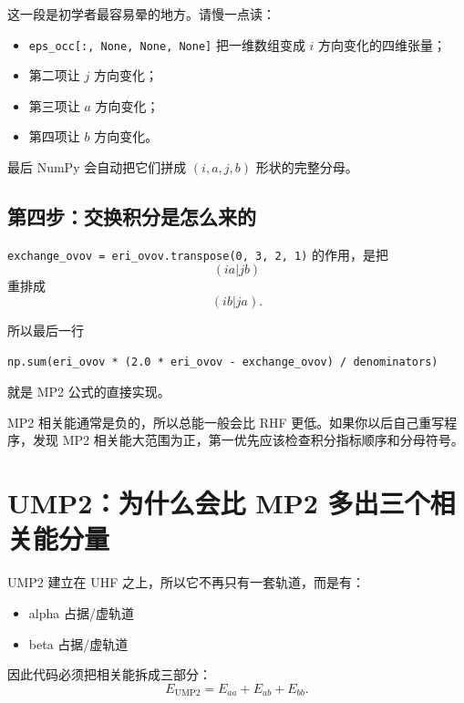 \documentclass[UTF8,11pt,fontset=fandol]{ctexbook}
\begin{document}
这一段是初学者最容易晕的地方。请慢一点读：
\begin{itemize}
  \item \texttt{eps\_occ[:, None, None, None]} 把一维数组变成 \(i\) 方向变化的四维张量；
  \item 第二项让 \(j\) 方向变化；
  \item 第三项让 \(a\) 方向变化；
  \item 第四项让 \(b\) 方向变化。
\end{itemize}

最后 NumPy 会自动把它们拼成 \((i,a,j,b)\) 形状的完整分母。

\subsection*{第四步：交换积分是怎么来的}

\texttt{exchange\_ovov = eri\_ovov.transpose(0, 3, 2, 1)} 的作用，是把
\begin{equation}
(ia|jb)
\end{equation}
重排成
\begin{equation}
(ib|ja).
\end{equation}

所以最后一行
\begin{lstlisting}[style=pythonstyle]
np.sum(eri_ovov * (2.0 * eri_ovov - exchange_ovov) / denominators)
\end{lstlisting}
就是 MP2 公式的直接实现。

\begin{warnbox}[初学者提醒]
MP2 相关能通常是负的，所以总能一般会比 RHF 更低。如果你以后自己重写程序，发现 MP2 相关能大范围为正，第一优先应该检查积分指标顺序和分母符号。
\end{warnbox}

\section{UMP2：为什么会比 MP2 多出三个相关能分量}



UMP2 建立在 UHF 之上，所以它不再只有一套轨道，而是有：
\begin{itemize}
  \item alpha 占据/虚轨道
  \item beta 占据/虚轨道
\end{itemize}

因此代码必须把相关能拆成三部分：
\begin{equation}
E_{\mathrm{UMP2}} = E_{aa} + E_{ab} + E_{bb}.
\end{equation}
\end{document}
